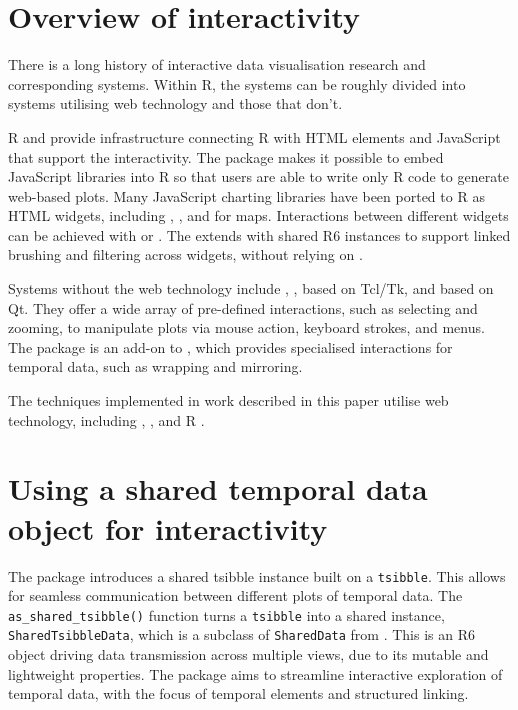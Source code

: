\hypertarget{overview-of-interactivity}{%
\section{Overview of interactivity}\label{overview-of-interactivity}}

There is a long history of interactive data visualisation research and
corresponding systems. Within R, the systems can be roughly divided into
systems utilising web technology and those that don't.

R  \citep{R-shiny} and 
\citep{R-htmlwidgets} provide infrastructure connecting R with HTML
elements and JavaScript that support the interactivity. The
 package makes it possible to embed JavaScript
libraries into R so that users are able to write only R code to generate
web-based plots. Many JavaScript charting libraries have been ported to
R as HTML widgets, including  \citep{plotly2020},
 \citep{R-rbokeh}, and 
\citep{R-leaflet} for maps. Interactions between different widgets can
be achieved with  or 
\citep{R-crosstalk}. The  extends
 with shared R6 instances to support linked
brushing and filtering across widgets, without relying on
.

Systems without the web technology include ,
 \citep{R-loon}, based on Tcl/Tk, and 
\citep{xie_reactive_2014} based on Qt. They offer a wide array of
pre-defined interactions, such as selecting and zooming, to manipulate
plots via mouse action, keyboard strokes, and menus. The
 package \citep{cheng_enabling_2016} is an add-on to
, which provides specialised interactions for temporal
data, such as wrapping and mirroring.

The techniques implemented in work described in this paper utilise web
technology, including , , and R
.

\hypertarget{using-a-shared-temporal-data-object-for-interactivity}{%
\section{Using a shared temporal data object for
interactivity}\label{using-a-shared-temporal-data-object-for-interactivity}}

The  package introduces a shared tsibble instance
built on a \texttt{tsibble}. This allows for seamless communication
between different plots of temporal data. The
\texttt{as\_shared\_tsibble()} function turns a \texttt{tsibble} into a
shared instance, \texttt{SharedTsibbleData}, which is a subclass of
\texttt{SharedData} from . This is an R6 object
driving data transmission across multiple views, due to its mutable and
lightweight properties. The  package aims to
streamline interactive exploration of temporal data, with the focus of
temporal elements and structured linking.

